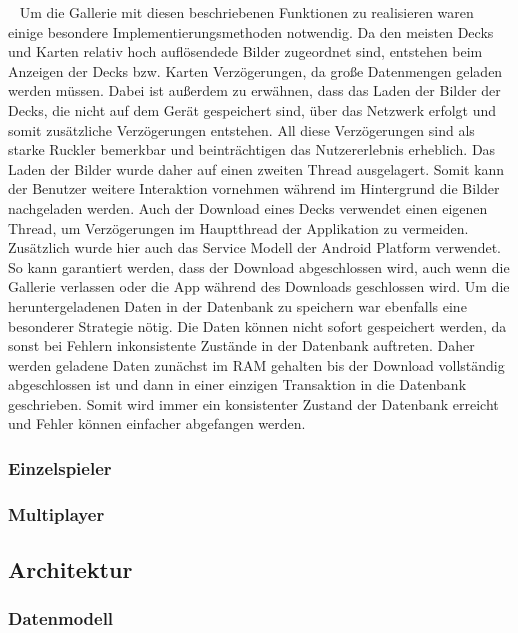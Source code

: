 \documentclass{scrartcl}
\begin{document}
\ \newline
Um die Gallerie mit diesen beschriebenen Funktionen zu
realisieren waren einige besondere Implementierungsmethoden notwendig. Da den
meisten Decks und Karten relativ hoch auflösendede Bilder zugeordnet sind,
entstehen beim Anzeigen der Decks bzw. Karten Verzögerungen, da große
Datenmengen geladen werden müssen. Dabei ist außerdem zu erwähnen, dass das
Laden der Bilder der Decks, die nicht auf dem Gerät gespeichert sind, über das
Netzwerk erfolgt und somit zusätzliche Verzögerungen entstehen. All diese
Verzögerungen sind als starke Ruckler bemerkbar und beinträchtigen das
Nutzererlebnis erheblich. Das Laden der Bilder wurde daher auf einen zweiten
Thread ausgelagert. Somit kann der Benutzer weitere Interaktion vornehmen
während im Hintergrund die Bilder nachgeladen werden. Auch der Download eines
Decks verwendet einen eigenen Thread, um Verzögerungen im Hauptthread der
Applikation zu vermeiden. Zusätzlich wurde hier auch das Service Modell der
Android Platform verwendet. So kann garantiert werden, dass der Download
abgeschlossen wird, auch wenn die Gallerie verlassen oder die App während des
Downloads geschlossen wird. Um die heruntergeladenen Daten in der Datenbank zu
speichern war ebenfalls eine besonderer Strategie nötig. Die Daten können nicht
sofort gespeichert werden, da sonst bei Fehlern inkonsistente Zustände in der
Datenbank auftreten. Daher werden geladene Daten zunächst im RAM gehalten
bis der Download vollständig abgeschlossen ist und dann in einer einzigen
Transaktion in die Datenbank geschrieben. Somit wird immer ein konsistenter
Zustand der Datenbank erreicht und Fehler können einfacher abgefangen werden.

\subsubsection{Einzelspieler}
\subsubsection{Multiplayer}
\subsection{Architektur}
\subsubsection{Datenmodell}
\end{document}
